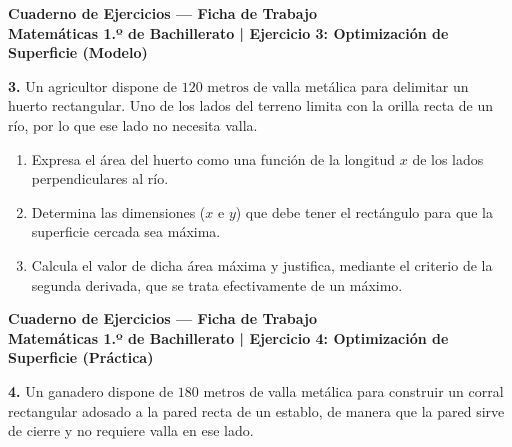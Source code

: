 ﻿\documentclass[11pt,a4paper]{article}
\begin{document}
\begin{center}
    {\LARGE \textbf{Cuaderno de Ejercicios — Ficha de Trabajo}}\\[4pt]
    {\large \textbf{Matemáticas 1.º de Bachillerato | Ejercicio 3: Optimización de Superficie (Modelo)}}
\end{center}

\vspace{0.8cm}
\noindent\textbf{3.} Un agricultor dispone de $120\text{ metros}$ de valla metálica para delimitar un huerto rectangular. Uno de los lados del terreno limita con la orilla recta de un río, por lo que ese lado no necesita valla.

\vspace{0.3cm}
\begin{enumerate}[label=\textbf{\alph*)}, leftmargin=2em, itemsep=12pt]
    \item Expresa el área del huerto como una función de la longitud $x$ de los lados perpendiculares al río.
    \item Determina las dimensiones ($x$ e $y$) que debe tener el rectángulo para que la superficie cercada sea máxima.
    \item Calcula el valor de dicha área máxima y justifica, mediante el criterio de la segunda derivada, que se trata efectivamente de un máximo.
\end{enumerate}

\newpage

\begin{center}
    {\LARGE \textbf{Cuaderno de Ejercicios — Ficha de Trabajo}}\\[4pt]
    {\large \textbf{Matemáticas 1.º de Bachillerato | Ejercicio 4: Optimización de Superficie (Práctica)}}
\end{center}

\vspace{0.8cm}
\noindent\textbf{4.} Un ganadero dispone de $180\text{ metros}$ de valla metálica para construir un corral rectangular adosado a la pared recta de un establo, de manera que la pared sirve de cierre y no requiere valla en ese lado.
\end{document}
